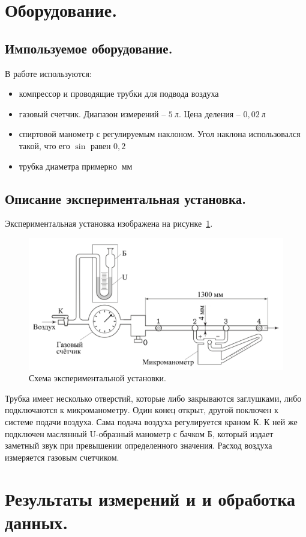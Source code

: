 \documentclass[a4paper,11pt]{article}
\begin{document}
\section{Оборудование.}
\subsection{Импользуемое оборудование.}
В работе используются:
\begin{itemize}
  \item компрессор и проводящие трубки для подвода воздуха
  \item газовый счетчик. Диапазон измерений -- $5\ л$. Цена деления -- $0,02\ л$
  \item спиртовой манометр с регулируемым наклоном. Угол наклона использовался такой, что его $\sin$ равен $0,2$
  \item трубка диаметра примерно $\ мм$
\end{itemize}
\subsection{Описание экспериментальная установка.}
Экспериментальная установка изображена на рисунке~\ref{fig:img1}.
\begin{figure}
  \includegraphics[scale = 0.224]{scheme1.png}
  \caption{Схема экспериментальной установки.}
  \label{fig:img1}
\end{figure}
Трубка имеет несколько отверстий, которые либо закрываются заглушками, либо подключаются к микроманометру. Один конец открыт, другой поключен к системе подачи воздуха. Сама подача воздуха регулируется краном К. К ней же подключен маслянный U-образный манометр с бачком Б, который издает заметный звук при превышении определенного значения. Расход воздуха измеряется газовым счетчиком.
\section{Результаты измерений и и обработка данных.}
\end{document}
